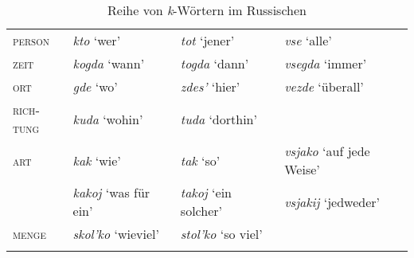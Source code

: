 \documentclass[output=paper, colorlinks, citecolor=brown, booklanguage=german]{langscibook}
\begin{document}
\begin{otherlanguage}{german}
\begin{table}[H]
\caption{Reihe von \textit{k}-Wörtern im Russischen}
\label{tab:reihen}
 \begin{tabularx}{.99\textwidth}{llll} %
  \lsptoprule
\textsc{person} & \textit{kto} `wer' & \textit{tot} `jener' & \textit{vse} `alle'\\
\textsc{zeit} & \textit{kogda} `wann' & \textit{togda} `dann'&  \textit{vsegda} `immer'\\
\textsc{ort} & \textit{gde} `wo' & \textit{zdes'} `hier' & \textit{vezde} `überall'\\
\textsc{richtung} & \textit{kuda} `wohin' & \textit{tuda} `dorthin' & \\
\textsc{art} & \textit{kak} `wie' & \textit{tak} `so' & \textit{vsjako} `auf jede Weise'\\
& \textit{kakoj} `was für ein' & \textit{takoj} `ein solcher' & \textit{vsjakij} `jedweder'\\                
 \textsc{menge} & \textit{skol'ko} `wieviel' & \textit{stol'ko} `so viel' & \\
  \lspbottomrule
 \end{tabularx}
\end{table}



\iffalse 


\end{otherlanguage}
\end{document}
